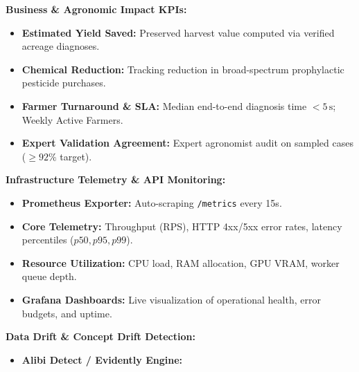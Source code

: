 \documentclass[8pt]{article}
\begin{document}
\vspace{2mm}%

\noindent%
\begin{tcolorbox}[
  canvasbox,
  colback=bgMonitor,
  colframe=headMonitor,
  title={10. LIVE EVALUATION, TELEMETRY \& DRIFT MONITORING},
  boxed title style={colback=headMonitor},
  height=36mm
]
\fontsize{7.2pt}{8.8pt}\selectfont
\begin{minipage}[t]{0.325\linewidth}
  \textbf{Business \& Agronomic Impact KPIs:}
  \begin{itemize}
    \item \textbf{Estimated Yield Saved:} Preserved harvest value computed via verified acreage diagnoses.
    \item \textbf{Chemical Reduction:} Tracking reduction in broad-spectrum prophylactic pesticide purchases.
    \item \textbf{Farmer Turnaround \& SLA:} Median end-to-end diagnosis time $<5\,\text{s}$; Weekly Active Farmers.
    \item \textbf{Expert Validation Agreement:} Expert agronomist audit on sampled cases ($\ge 92\%$ target).
  \end{itemize}
\end{minipage}%
\hfill%
\begin{minipage}[t]{0.33\linewidth}
  \textbf{Infrastructure Telemetry \& API Monitoring:}
  \begin{itemize}
    \item \textbf{Prometheus Exporter:} Auto-scraping \texttt{/metrics} every 15s.
    \item \textbf{Core Telemetry:} Throughput (RPS), HTTP 4xx/5xx error rates, latency percentiles ($p50, p95, p99$).
    \item \textbf{Resource Utilization:} CPU load, RAM allocation, GPU VRAM, worker queue depth.
    \item \textbf{Grafana Dashboards:} Live visualization of operational health, error budgets, and uptime.
  \end{itemize}
\end{minipage}%
\hfill%
\begin{minipage}[t]{0.325\linewidth}
  \textbf{Data Drift \& Concept Drift Detection:}
  \begin{itemize}
    \item \textbf{Alibi Detect / Evidently Engine:}

\end{itemize}
\end{minipage}
\end{tcolorbox}
\end{document}
